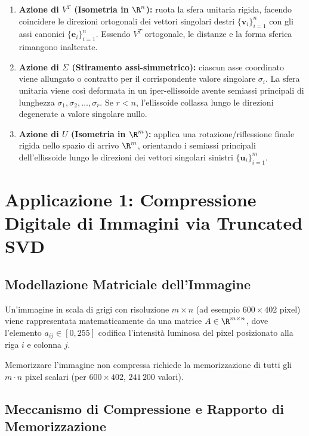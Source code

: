 \begin{enumerate}
    \item \textbf{Azione di $V^T$ (Isometria in $\R^n$):} ruota la sfera unitaria rigida, facendo coincidere le direzioni ortogonali dei vettori singolari destri $\{\mathbf{v}_i\}_{i=1}^n$ con gli assi canonici $\{\mathbf{e}_i\}_{i=1}^n$. Essendo $V^T$ ortogonale, le distanze e la forma sferica rimangono inalterate.
    \item \textbf{Azione di $\Sigma$ (Stiramento assi-simmetrico):} ciascun asse coordinato viene allungato o contratto per il corrispondente valore singolare $\sigma_i$. La sfera unitaria viene cos\`i deformata in un iper-ellissoide avente semiassi principali di lunghezza $\sigma_1, \sigma_2, \dots, \sigma_r$. Se $r < n$, l'ellissoide collassa lungo le direzioni degenerate a valore singolare nullo.
    \item \textbf{Azione di $U$ (Isometria in $\R^m$):} applica una rotazione/riflessione finale rigida nello spazio di arrivo $\R^m$, orientando i semiassi principali dell'ellissoide lungo le direzioni dei vettori singolari sinistri $\{\mathbf{u}_i\}_{i=1}^m$.
\end{enumerate}

\FloatBarrier
\section{Applicazione 1: Compressione Digitale di Immagini via Truncated SVD}
\label{sec:applicazione-compressione-immagini}

\subsection{Modellazione Matriciale dell'Immagine}

Un'immagine in scala di grigi con risoluzione $m \times n$ (ad esempio $600 \times 402$ pixel) viene rappresentata matematicamente da una matrice $A \in \R^{m \times n}$, dove l'elemento $a_{ij} \in [0, 255]$ codifica l'intensit\`a luminosa del pixel posizionato alla riga $i$ e colonna $j$.

Memorizzare l'immagine non compressa richiede la memorizzazione di tutti gli $m \cdot n$ pixel scalari (per $600 \times 402$, $241\,200$ valori).

\subsection{Meccanismo di Compressione e Rapporto di Memorizzazione}

